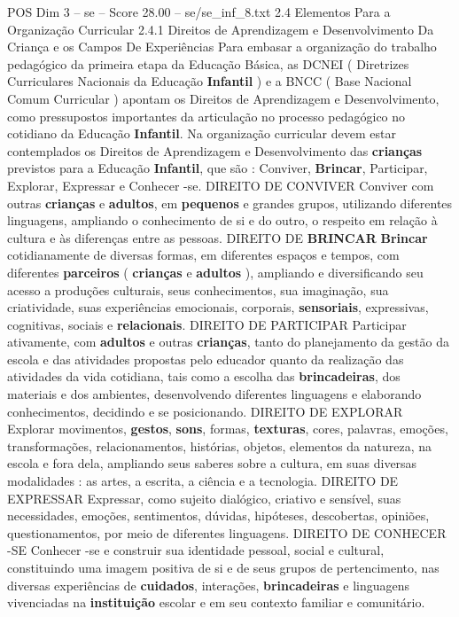 \begin{textsample}{POS Dim 3 – se – Score 28.00 – se/se\_inf\_8.txt}  \label{ex:f3_pos_162}
2.4 Elementos Para a Organização Curricular 2.4.1 Direitos de Aprendizagem e Desenvolvimento Da Criança e os Campos De Experiências Para embasar a organização do trabalho pedagógico da primeira etapa da Educação Básica, as DCNEI ( Diretrizes Curriculares Nacionais da Educação \textbf{Infantil} ) e a BNCC ( Base Nacional Comum Curricular ) apontam os Direitos de Aprendizagem e Desenvolvimento, como pressupostos importantes da articulação no processo pedagógico no cotidiano da Educação \textbf{Infantil}.
Na organização curricular devem estar contemplados os Direitos de Aprendizagem e Desenvolvimento das \textbf{crianças} previstos para a Educação \textbf{Infantil}, que são : Conviver, \textbf{Brincar}, Participar, Explorar, Expressar e Conhecer -se.
DIREITO DE CONVIVER Conviver com outras \textbf{crianças} e \textbf{adultos}, em \textbf{pequenos} e grandes grupos, utilizando diferentes linguagens, ampliando o conhecimento de si e do outro, o respeito em relação à cultura e às diferenças entre as pessoas.
DIREITO DE \textbf{BRINCAR} \textbf{Brincar} cotidianamente de diversas formas, em diferentes espaços e tempos, com diferentes \textbf{parceiros} ( \textbf{crianças} e \textbf{adultos} ), ampliando e diversificando seu acesso a produções culturais, seus conhecimentos, sua imaginação, sua criatividade, suas experiências emocionais, corporais, \textbf{sensoriais}, expressivas, cognitivas, sociais e \textbf{relacionais}.
DIREITO DE PARTICIPAR Participar ativamente, com \textbf{adultos} e outras \textbf{crianças}, tanto do planejamento da gestão da escola e das atividades propostas pelo educador quanto da realização das atividades da vida cotidiana, tais como a escolha das \textbf{brincadeiras}, dos materiais e dos ambientes, desenvolvendo diferentes linguagens e elaborando conhecimentos, decidindo e se posicionando.
DIREITO DE EXPLORAR Explorar movimentos, \textbf{gestos}, \textbf{sons}, formas, \textbf{texturas}, cores, palavras, emoções, transformações, relacionamentos, histórias, objetos, elementos da natureza, na escola e fora dela, ampliando seus saberes sobre a cultura, em suas diversas modalidades : as artes, a escrita, a ciência e a tecnologia.
DIREITO DE EXPRESSAR Expressar, como sujeito dialógico, criativo e sensível, suas necessidades, emoções, sentimentos, dúvidas, hipóteses, descobertas, opiniões, questionamentos, por meio de diferentes linguagens.
DIREITO DE CONHECER -SE Conhecer -se e construir sua identidade pessoal, social e cultural, constituindo uma imagem positiva de si e de seus grupos de pertencimento, nas diversas experiências de \textbf{cuidados}, interações, \textbf{brincadeiras} e linguagens vivenciadas na \textbf{instituição} escolar e em seu contexto familiar e comunitário.

\end{textsample}
